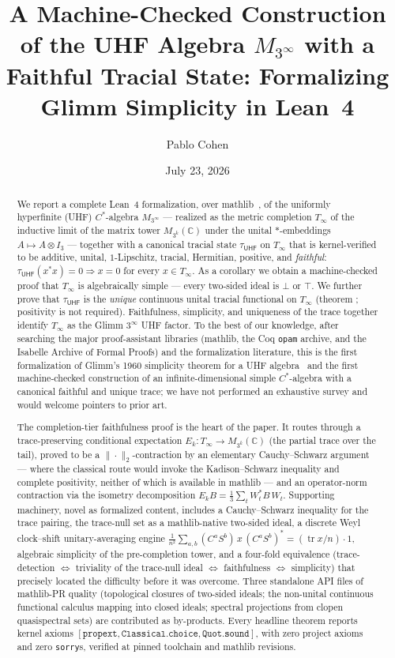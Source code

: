 \documentclass[11pt,a4paper]{amsart}
\title[A Machine-Checked UHF Algebra with a Faithful Trace]{A Machine-Checked Construction of the UHF Algebra \texorpdfstring{$M_{3^\infty}$}{M(3\textasciicircum\ensuremath{\infty})} with a Faithful Tracial State: Formalizing Glimm Simplicity in Lean~4}
\author{Pablo Cohen}
\date{July 23, 2026}
\theoremstyle{plain}
\theoremstyle{definition}
\newcommand{\lt}[1]{\texttt{\seqsplit{#1}}}
\newcommand{\Tinf}{T_\infty}
\newcommand{\tuhf}{\tau_{\mathsf{UHF}}}
\begin{document}
\begin{abstract}
\noindent We report a complete Lean~4 formalization, over
mathlib~\cite{mathlib2020,moura-ullrich2021}, of the uniformly hyperfinite
(UHF) $C^*$-algebra $M_{3^\infty}$ --- realized as the metric completion
$\Tinf$ of the inductive limit of the matrix tower $M_{3^k}(\mathbb{C})$
under the unital $*$-embeddings $A \mapsto A \otimes I_3$ --- together with
a canonical tracial state $\tuhf$ on $\Tinf$ that is kernel-verified to be
additive, unital, $1$-Lipschitz, tracial, Hermitian, positive, and
\emph{faithful}: $\tuhf(x^*x) = 0 \Rightarrow x = 0$ for every $x \in \Tinf$.
As a corollary we obtain a machine-checked proof that $\Tinf$ is
algebraically simple --- every two-sided ideal is $\bot$ or $\top$. We
further prove that $\tau_{\mathsf{UHF}}$ is the \emph{unique} continuous
unital tracial functional on $\Tinf$ (theorem
\lt{substrate\_UHF\_trace\_unique}; positivity is not required). Faithfulness,
simplicity, and uniqueness of the trace together identify $\Tinf$ as the
Glimm $3^\infty$ UHF factor. To the best of our knowledge, after searching
the major proof-assistant libraries (mathlib, the Coq \texttt{opam} archive,
and the Isabelle Archive of Formal Proofs) and the formalization literature,
this is the first formalization of Glimm's 1960 simplicity theorem for a UHF
algebra~\cite{glimm1960} and the first machine-checked construction of an
infinite-dimensional simple $C^*$-algebra with a canonical faithful and
unique trace; we have not performed an exhaustive survey and would welcome
pointers to prior art.

\smallskip

\noindent The completion-tier faithfulness proof is the heart of the paper.
It routes through a trace-preserving conditional expectation
$E_k \colon \Tinf \to M_{3^k}(\mathbb{C})$ (the partial trace over the
tail), proved to be a $\|\cdot\|_2$-contraction by an elementary
Cauchy--Schwarz argument --- where the classical route would invoke the
Kadison--Schwarz inequality and complete positivity, neither of which is
available in mathlib --- and an operator-norm contraction via the isometry
decomposition $E_k B = \tfrac{1}{3}\sum_{t} W_t^* B\, W_t$. Supporting
machinery, novel as formalized content, includes a Cauchy--Schwarz
inequality for the trace pairing, the trace-null set as a mathlib-native
two-sided ideal, a discrete Weyl clock--shift unitary-averaging engine
$\tfrac{1}{n^2}\sum_{a,b}(C^aS^b)\,x\,(C^aS^b)^* = (\operatorname{tr}x/n)\cdot 1$,
algebraic simplicity of the pre-completion tower, and a four-fold
equivalence (trace-detection $\Leftrightarrow$ triviality of the trace-null
ideal $\Leftrightarrow$ faithfulness $\Leftrightarrow$ simplicity)
that precisely located the difficulty before it was overcome. Three
standalone API files of mathlib-PR quality (topological closures of
two-sided ideals; the non-unital continuous functional calculus mapping
into closed ideals; spectral projections from clopen quasispectral sets)
are contributed as by-products. Every headline theorem reports kernel axioms
$[\texttt{propext}, \texttt{Classical.choice}, \texttt{Quot.sound}]$, with
zero project axioms and zero \texttt{sorry}s, verified at pinned toolchain
and mathlib revisions.
\end{abstract}
\end{document}
